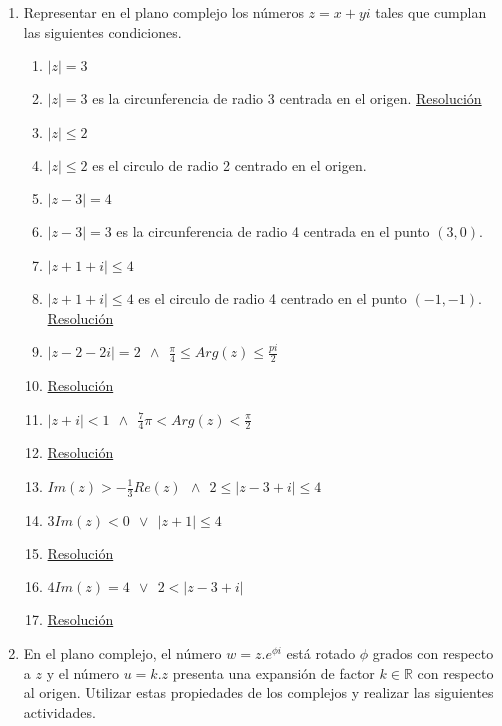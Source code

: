 \documentclass[a4paper]{article}
\newcommand{\answer}{\item[**]}
\newcommand{\exercise}{\item}
\newcommand{\df}[2]{\displaystyle\frac{#1}{#2}}
\begin{document}
\begin{enumerate}
\begin{multicols}{2}
\begin{enumerate} [label=(\alph*)]
	\end{enumerate}
	\end{multicols}

	\exercise Representar en el plano complejo los números $z=x+yi$ tales que cumplan las siguientes condiciones.
	\begin{multicols}{2}
	\begin{enumerate} [label=(\alph*)]
		
		\item $|z|=3$
		\answer $|z|=3$ es la circunferencia de radio 3 centrada en el origen. \href{https://youtu.be/AQVEp9ncSwQ}{Resolución}

		\item $|z|\leq 2$
		\answer $|z|\leq 2$ es el circulo de radio 2 centrado en el origen.

		\item $|z-3| = 4$
		\answer $|z-3| = 3$ es la circunferencia de radio 4 centrada en el punto $(3,0)$.

		\item $|z+1+i| \leq 4$
		\answer $|z+1+i| \leq 4$ es el circulo de radio 4 centrado en el punto $(-1,-1)$. \href{https://youtu.be/Rj6VfY1fLzw}{Resolución}

		\item $|z-2-2i|=2 ~~\land~~ \df{\pi}{4} \leq Arg(z) \leq \df{pi}{2}$
		\answer \href{https://youtu.be/5OHpMCsd8iE}{Resolución}

		\item $|z+i|<1 ~~\land~~ \df{7}{4}\pi < Arg(z) < \df{\pi}{2}$
		\answer \href{https://youtu.be/OhXOvWcryMI}{Resolución}
		
		\item $Im(z)> -\df{1}{3}Re(z) ~~\land~~ 2 \leq |z-3+i| \leq 4$

		\item $3Im(z)<0 ~~\lor~~ |z+1| \leq 4$
		\answer \href{https://youtu.be/9pxsYXL6k88}{Resolución}

		\item $4Im(z)=4 ~~\lor~~ 2<|z-3+i|$
		\answer \href{https://youtu.be/3m1ZDSuXsX8}{Resolución}

	\end{enumerate}
	\end{multicols}

	\exercise En el plano complejo, el número $w=z.e^{\phi i}$ está rotado $\phi$ grados con respecto a $z$ y el número $u=k.z$ presenta una expansión de factor $k\in \mathbb{R}$ con respecto al origen. Utilizar estas propiedades de los complejos y realizar las siguientes actividades.
	\begin{enumerate} [label=(\alph*)]


\end{enumerate}
\end{enumerate}
\end{document}
